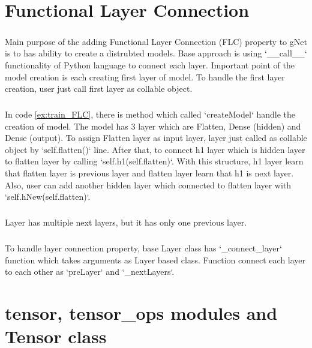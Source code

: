 \documentclass[12pt]{report}
\begin{document}
\chapter{Functional Layer Connection}
\label{ch:FLC}

\paragraph{}
Main purpose of the adding Functional Layer Connection (FLC) property to gNet is to has ability to create a distrubted models. Base approach is using `\_\_call\_\_` functionality of Python language to connect each layer. Important point of the model creation is each creating first layer of model. To handle the first layer creation, user just call first layer as collable object. 

\paragraph{}
In code \ref{ex:train_FLC}, there is method which called `createModel` handle the creation of model. The model has 3 layer which are Flatten, Dense (hidden) and Dense (output). To assign Flatten layer as input layer, layer just called as collable object by `self.flatten()` line. After that, to connect h1 layer which is hidden layer to flatten layer by calling `self.h1(self.flatten)`. With this structure, h1 layer learn that flatten layer is previous layer and flatten layer learn that h1 is next layer. Also, user can add another hidden layer which connected to flatten layer with `self.hNew(self.flatten)`. 

\paragraph{}
Layer has multiple next layers, but it has only one previous layer. 

\paragraph{}
To handle layer connection property, base Layer class has `\_connect\_layer` function which takes arguments as Layer based class. Function connect each layer to each other as `preLayer` and `\_nextLayers`.




\chapter{tensor, tensor\_ops modules and Tensor class}
\end{document}
